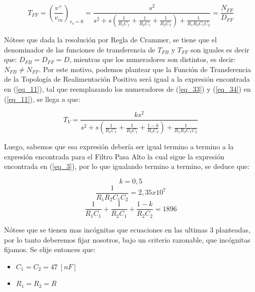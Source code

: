 \documentclass[12pt,a4paper]{article}
\begin{document}
\begin{equation}
    \label{eq_34}
    T_{FF} = \left(\frac{v^+}{v_{in}}\right)_{v_{o} = 0} = \frac{s^2}{s^2 + s\left(\frac{1}{R_{1}C_{1}} + \frac{1}{R_{2}C_{1}} + \frac{1}{R_{2}C_{2}}\right) + \frac{1}{R_{1}R_{2}C_{1}C_{2}}} = \frac{N_{FF}}{D_{FF}}
\end{equation}

Nótese que dada la resolución por Regla de Crammer, se tiene que el denominador de las funciones de transferencia de $T_{FB}$ y $T_{FF}$ son iguales es decir que: $D_{FB} = D_{FF} = D$, mientras que los  numeradores son distintos, es decir: $N_{FB} \ne N_{FF}$. Por este motivo, podemos plantear que la Función de Transferencia de la Topología de Realimentación Positiva será igual a la expresión encontrada en (\ref{eq_11}), tal que reemplazando los numeradores de (\ref{eq_33}) y (\ref{eq_34}) en (\ref{eq_11}), se llega a que:

\begin{equation}
    \label{eq_35}
    T_V = \frac{ks^2}{s^2 + s\left(\frac{1}{R_{1}C_{1}} + \frac{1}{R_{2}C_{1}} + \frac{1-k}{R_{2}C_{2}}\right) + \frac{1}{R_{1}R_{2}C_{1}C_{2}}}
\end{equation}

Luego, sabemos que esa expresión debería ser igual termino a termino a la expresión encontrada para el Filtro Pasa Alto la cual sigue la expresión encontrada en (\ref{eq_3}), por lo que igualando termino a termino, se deduce que:

\begin{equation}
    \label{eq_36}
    k = 0,5
\end{equation}
\begin{equation}
    \label{eq_37}
    \frac{1}{R_{1}R_{2}C_{1}C_{2}} = 2,35x10^{7}
\end{equation}
\begin{equation}
    \label{eq_38}
    \frac{1}{R_{1}C_{1}} + \frac{1}{R_{2}C_{1}} + \frac{1-k}{R_{2}C_{2}} = 1896
\end{equation}

Nótese que se tienen mas incógnitas que ecuaciones en las ultimas 3 planteadas, por lo tanto deberemos fijar nosotros, bajo un criterio razonable, que incógnitas fijamos. Se elije entonces que:

\begin{itemize}
    \item $C_{1} = C_{2} = 47 \ [nF]$
    \item $R_{1} = R_{2} = R$ 
\end{itemize}
\end{document}
